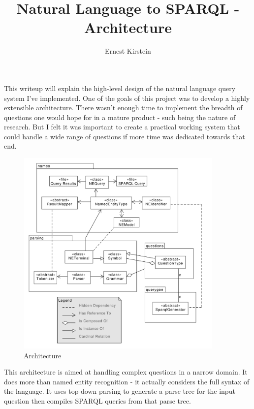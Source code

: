 \documentclass[11pt]{article}
\begin{document}
\title{Natural Language to SPARQL - Architecture}
\author{Ernest Kirstein}
\maketitle

This writeup will explain the high-level design of the natural language query
system I've implemented. One of the goals of this project was to develop a
highly extensible architecture. There wasn't enough time to implement the
breadth of questions one would hope for in a mature product - such being
the nature of research. But I felt it was important to create a practical
working system that could handle a wide range of questions if more
time was dedicated towards that end.

\begin{figure}[h!]
    \centering
    \includegraphics[width=0.9\textwidth,natwidth=1,natheight=1]{architecture.pdf}
    \caption{Architecture}
    \label{fig:arch}
\end{figure}

This architecture is aimed at handling complex questions in a narrow domain.
It does more than named entity recognition - it actually considers
the full syntax of the language. It uses
top-down parsing to generate a parse tree for the input question then
compiles SPARQL queries from that parse tree.
\end{document}
